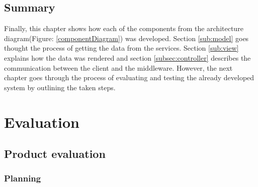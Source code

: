 \documentclass{l4proj}
\begin{document}

\section{Summary}
Finally, this chapter shows how each of the components from the architecture diagram(Figure: \ref{componentDiagram}) was developed. Section \ref{sub:model} goes thought the process of getting the data from the services. Section \ref{sub:view} explains how the data was rendered and section \ref{subsec:controller} describes the communication between the client and the middleware. However, the next chapter goes through the process of evaluating and testing the already developed system by outlining the taken steps.  

\chapter{Evaluation}

\section{Product evaluation}

\subsection{Planning}
\end{document}
